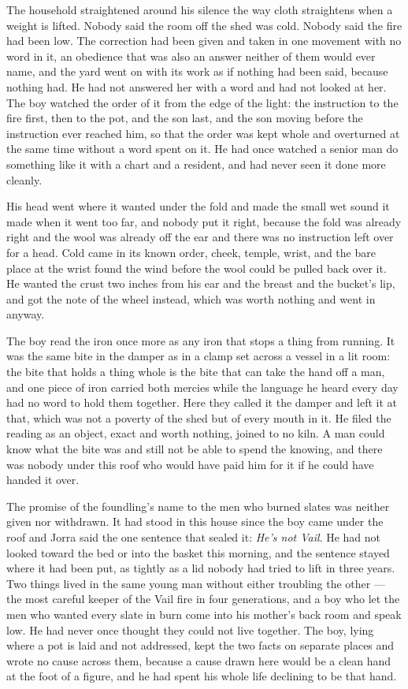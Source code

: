 The household straightened around his silence the way cloth straightens when a weight is lifted. Nobody said the room off the shed was cold. Nobody said the fire had been low. The correction had been given and taken in one movement with no word in it, an obedience that was also an answer neither of them would ever name, and the yard went on with its work as if nothing had been said, because nothing had. He had not answered her with a word and had not looked at her. The boy watched the order of it from the edge of the light: the instruction to the fire first, then to the pot, and the son last, and the son moving before the instruction ever reached him, so that the order was kept whole and overturned at the same time without a word spent on it. He had once watched a senior man do something like it with a chart and a resident, and had never seen it done more cleanly.

His head went where it wanted under the fold and made the small wet sound it made when it went too far, and nobody put it right, because the fold was already right and the wool was already off the ear and there was no instruction left over for a head. Cold came in its known order, cheek, temple, wrist, and the bare place at the wrist found the wind before the wool could be pulled back over it. He wanted the crust two inches from his ear and the breast and the bucket's lip, and got the note of the wheel instead, which was worth nothing and went in anyway.

The boy read the iron once more as any iron that stops a thing from running. It was the same bite in the damper as in a clamp set across a vessel in a lit room: the bite that holds a thing whole is the bite that can take the hand off a man, and one piece of iron carried both mercies while the language he heard every day had no word to hold them together. Here they called it the damper and left it at that, which was not a poverty of the shed but of every mouth in it. He filed the reading as an object, exact and worth nothing, joined to no kiln. A man could know what the bite was and still not be able to spend the knowing, and there was nobody under this roof who would have paid him for it if he could have handed it over.

The promise of the foundling's name to the men who burned slates was neither given nor withdrawn. It had stood in this house since the boy came under the roof and Jorra said the one sentence that sealed it: \emph{He's not Vail}. He had not looked toward the bed or into the basket this morning, and the sentence stayed where it had been put, as tightly as a lid nobody had tried to lift in three years. Two things lived in the same young man without either troubling the other --- the most careful keeper of the Vail fire in four generations, and a boy who let the men who wanted every slate in  burn come into his mother's back room and speak low. He had never once thought they could not live together. The boy, lying where a pot is laid and not addressed, kept the two facts on separate places and wrote no cause across them, because a cause drawn here would be a clean hand at the foot of a figure, and he had spent his whole life declining to be that hand.

